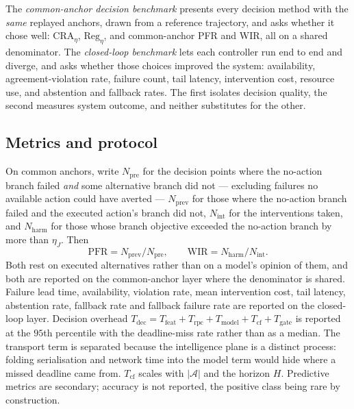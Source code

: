 \documentclass[journal]{IEEEtran}
\newcommand{\Aset}{\mathcal{A}}
\begin{document}
The \emph{common-anchor decision benchmark} presents every decision method with
the \emph{same} replayed anchors, drawn from a reference trajectory, and asks
whether it chose well: $\mathrm{CRA}_\eta$, $\mathrm{Reg}_\eta$, and
common-anchor PFR and WIR, all on a shared denominator. The \emph{closed-loop
benchmark} lets each controller run end to end and diverge, and asks whether
those choices improved the system: availability, agreement-violation rate,
failure count, tail latency, intervention cost, resource use, and
abstention and fallback rates. The first isolates decision quality, the second
measures system outcome, and neither substitutes for the other.

\subsection{Metrics and protocol}
On common anchors, write $N_{\mathrm{pre}}$ for the decision points where the no-action branch
failed \emph{and} some alternative branch did not --- excluding failures no
available action could have averted --- $N_{\mathrm{prev}}$ for those where the
no-action branch failed and the executed action's branch did not, $N_{\mathrm{int}}$
for the interventions taken, and $N_{\mathrm{harm}}$ for those whose branch
objective exceeded the no-action branch by more than $\eta_J$. Then
\begin{equation}
\mathrm{PFR}=N_{\mathrm{prev}}/N_{\mathrm{pre}},
\qquad
\mathrm{WIR}=N_{\mathrm{harm}}/N_{\mathrm{int}}.
\label{eq:pfr}
\end{equation}
Both rest on executed alternatives rather than on a model's opinion of them, and
both are reported on the common-anchor layer where the denominator is shared.
Failure lead time, availability, violation rate, mean intervention cost, tail
latency, abstention rate, fallback rate and fallback failure rate are reported
on the closed-loop layer. Decision overhead
$T_{\mathrm{dec}}=T_{\mathrm{feat}}+T_{\mathrm{rpc}}+T_{\mathrm{model}}
+T_{\mathrm{cf}}+T_{\mathrm{gate}}$ is reported at the $95$th percentile with
the deadline-miss rate rather than as a median. The transport term is separated
because the intelligence plane is a distinct process: folding serialisation and
network time into the model term would hide where a missed deadline came from.
$T_{\mathrm{cf}}$ scales with $|\Aset|$ and the horizon $H$. Predictive metrics are secondary; accuracy is not reported, the
positive class being rare by construction.
\end{document}
